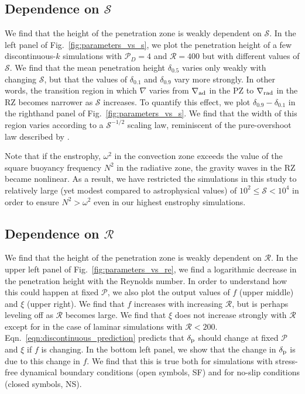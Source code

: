 \documentclass[twocolumn]{aastex631}
\newcommand{\gradrad}{\ensuremath{\nabla_{\rm{rad}}}}
\newcommand{\gradad}{\ensuremath{\nabla_{\rm{ad}}}}
\newcommand{\justgrad}{\ensuremath{\nabla}}
\newcommand{\delp}{\ensuremath{\delta_{\rm{p}}}}
\newcommand{\mP}{\ensuremath{\mathcal{P}}}
\newcommand{\mR}{\ensuremath{\mathcal{R}}}
\newcommand{\mS}{\ensuremath{\mathcal{S}}}
\begin{document}
\subsection{Dependence on $\mS$}

We find that the height of the penetration zone is weakly dependent on $\mS$.
In the left panel of Fig.~\ref{fig:parameters_vs_s}, we plot the penetration height of a few discontinuous-$k$ simulations with $\mP_D = 4$ and $\mR = 400$ but with different values of $\mS$.
We find that the mean penetration height $\delta_{0.5}$ varies only weakly with changing $\mS$, but that the values of $\delta_{0.1}$ and $\delta_{0.9}$ vary more strongly.
In other words, the transition region in which $\justgrad$ varies from $\gradad$ in the PZ to $\gradrad$ in the RZ becomes narrower as $\mS$ increases.
To quantify this effect, we plot $\delta_{0.9} - \delta_{0.1}$ in the righthand panel of Fig.~\ref{fig:parameters_vs_s}.
We find that the width of this region varies according to a $\mS^{-1/2}$ scaling law, reminiscent of the pure-overshoot law described by \citet{korre_etal_2019}.

Note that if the enstrophy, $\omega^2$ in the convection zone exceeds the value of the square buoyancy frequency $N^2$ in the radiative zone, the gravity waves in the RZ became nonlinear.
As a result, we have restricted the simulations in this study to relatively large (yet modest compared to astrophysical values) of $10^{2} \leq \mS < 10^4$ in order to ensure $N^2 > \omega^2$ even in our highest enstrophy simulations.



\subsection{Dependence on $\mR$}

We find that the height of the penetration zone is weakly dependent on $\mR$.
In the upper left panel of Fig.~\ref{fig:parameters_vs_re}, we find a logarithmic decrease in the penetration height with the Reynolds number.
In order to understand how this could happen at fixed $\mP$, we also plot the output values of $f$ (upper middle) and $\xi$ (upper right).
We find that $f$ increases with increasing $\mR$, but is perhaps leveling off as $\mR$ becomes large.
We find that $\xi$ does not increase strongly with $\mR$ except for in the case of laminar simulations with $\mR < 200$.
Eqn.~\ref{eqn:discontinuous_prediction} predicts that $\delp$ should change at fixed $\mP$ and $\xi$ if $f$ is changing.
In the bottom left panel, we show that the change in $\delp$ is due to this change in $f$.
We find that this is true both for simulations with stress-free dynamical boundary conditions (open symbols, SF) and for no-slip conditions (closed symbols, NS).
\end{document}
